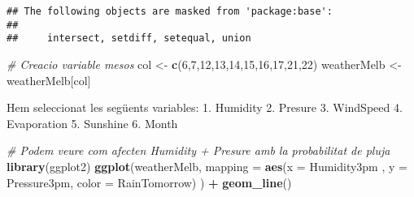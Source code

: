\documentclass[
]{article}
\newenvironment{Shaded}{\begin{snugshade}}{\end{snugshade}}
\newcommand{\CommentTok}[1]{\textcolor[rgb]{0.56,0.35,0.01}{\textit{#1}}}
\newcommand{\DataTypeTok}[1]{\textcolor[rgb]{0.13,0.29,0.53}{#1}}
\newcommand{\DecValTok}[1]{\textcolor[rgb]{0.00,0.00,0.81}{#1}}
\newcommand{\KeywordTok}[1]{\textcolor[rgb]{0.13,0.29,0.53}{\textbf{#1}}}
\newcommand{\NormalTok}[1]{#1}
\newcommand{\OperatorTok}[1]{\textcolor[rgb]{0.81,0.36,0.00}{\textbf{#1}}}
\newcommand{\StringTok}[1]{\textcolor[rgb]{0.31,0.60,0.02}{#1}}
\begin{document}
\begin{verbatim}
## The following objects are masked from 'package:base':
## 
##     intersect, setdiff, setequal, union
\end{verbatim}

\begin{Shaded}
\end{Shaded}

\begin{Shaded}
\begin{Highlighting}[]
\CommentTok{#  Creacio variable mesos}
\NormalTok{col <-}\StringTok{ }\KeywordTok{c}\NormalTok{(}\DecValTok{6}\NormalTok{,}\DecValTok{7}\NormalTok{,}\DecValTok{12}\NormalTok{,}\DecValTok{13}\NormalTok{,}\DecValTok{14}\NormalTok{,}\DecValTok{15}\NormalTok{,}\DecValTok{16}\NormalTok{,}\DecValTok{17}\NormalTok{,}\DecValTok{21}\NormalTok{,}\DecValTok{22}\NormalTok{)}
\NormalTok{weatherMelb <-}\StringTok{ }\NormalTok{weatherMelb[col]}
\end{Highlighting}
\end{Shaded}

Hem seleccionat les següents variables: 1. Humidity 2. Presure 3.
WindSpeed 4. Evaporation 5. Sunshine 6. Month

\begin{Shaded}
\begin{Highlighting}[]
\CommentTok{# Podem veure com afecten Humidity + Presure amb la probabilitat de pluja}
\KeywordTok{library}\NormalTok{(ggplot2)}
\KeywordTok{ggplot}\NormalTok{(weatherMelb, }\DataTypeTok{mapping =} \KeywordTok{aes}\NormalTok{(}\DataTypeTok{x =}\NormalTok{ Humidity3pm , }\DataTypeTok{y =}\NormalTok{ Pressure3pm, }\DataTypeTok{color =}\NormalTok{ RainTomorrow) ) }\OperatorTok{+}\StringTok{ }\KeywordTok{geom_line}\NormalTok{()}
\end{Highlighting}
\end{Shaded}
\end{document}
